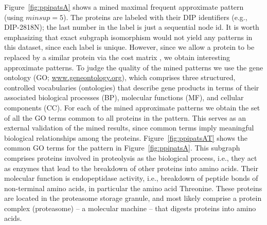 \smallskip{}
Figure~\ref{fig:ppipatsA} shows a mined
maximal frequent approximate pattern (using $minsup=5$). The proteins
are labeled with their DIP identifiers (e.g., DIP-2818N); the last
number in the label is just a sequential node id.  It is worth
emphasizing that exact subgraph isomorphism would not yield any patterns
in this dataset, since each label is unique. However, since we allow a
protein to be replaced by a similar protein via the cost matrix \Cs,
we obtain interesting approximate patterns. 
To judge the quality of the
mined patterns we use the gene ontology (GO;
\url{www.geneontology.org}), which comprises three structured,
controlled vocabularies (ontologies) that describe gene products in
terms of their associated biological processes (BP), molecular functions
(MF), and cellular components (CC).  For each of the mined approximate
patterns we obtain the set of all the GO terms common to all proteins in
the pattern. This serves as an external validation of the mined results,
since common terms imply meaningful biological relationships among the
proteins.  Figure~\ref{fig:ppipatsAT} shows the common GO terms for
the pattern in Figure~\ref{fig:ppipatsA}.  
This subgraph comprises proteins involved in proteolysis
as the biological process, i.e., they act as enzymes that lead to the
breakdown of other proteins into amino acids. Their molecular function
is endopeptidase activity, i.e., breakdown of peptide bonds of
non-terminal amino acids, in particular the amino acid Threonine.  These
proteins are located in the proteasome storage granule, and most likely
comprise a protein complex (proteasome) -- a molecular machine --
that digests proteins into amino acids.  
